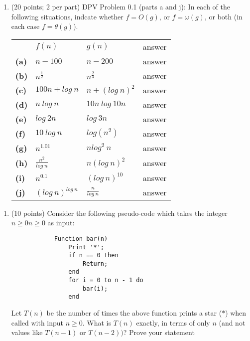 \documentclass{article}
\begin{document}
    \begin{enumerate}[label=\textbf{Q1}]
        \item (20 points; 2 per part) DPV Problem 0.1 (parts a and j): In each of the following situations, indcate whether $f = O(g)$, or $f = \omega(g)$, or both (in each case $f = \theta(g)$).\\[0.25in]
        \begin{tabular}{l l l l}
            &$f(n)$ & $g(n)$ & answer\\
            \textbf{(a)} & $n - 100$ & $n - 200$ & answer\\
            \textbf{(b)} & $n^{\frac{1}{2}}$ & $n^{\frac{2}{3}}$ & answer\\
            \textbf{(c)} & $100n + log\ n$ & $n + (log\ n)^2$ & answer\\
            \textbf{(d)} & $n\ log\ n$ & $10n\ log\ 10n$ & answer\\
            \textbf{(e)} & $log\ 2n$ & $log\ 3n$ & answer\\
            \textbf{(f)} & $10\ log\ n$ & $log(n^2)$ & answer\\
            \textbf{(g)} & $n^{1.01}$ & $nlog^2\ n$ & answer\\
            \textbf{(h)} & $\frac{n^2}{log\ n}$ & $n(log\ n)^2$ & answer\\
            \textbf{(i)} & $n^{0.1}$ & $(log\ n)^{10}$ & answer\\
            \textbf{(j)} & $(log\ n)^{log\ n}$ & $\frac{n}{log\ n}$ & answer\\
        \end{tabular}
    \end{enumerate}

    \begin{enumerate}[label=\textbf{Q2}]
        \item (10 points) Consider the following pseudo-code which takes the integer $n \geq 0n \geq 0$ as input:
        \begin{verbatim}
            Function bar(n)
                Print '*';
                if n == 0 then
                    Return;
                end
                for i = 0 to n - 1 do
                    bar(i);
                end
        \end{verbatim}
        Let $T(n)$ be the number of times the above function prints a star ($*$) when called with input $n \geq 0$.
        What is $T(n)$ exactly, in terms of only $n$ (and not values like $T(n - 1)$ or $T(n - 2))$? Prove your
        statement
    \end{enumerate}
\end{document}
